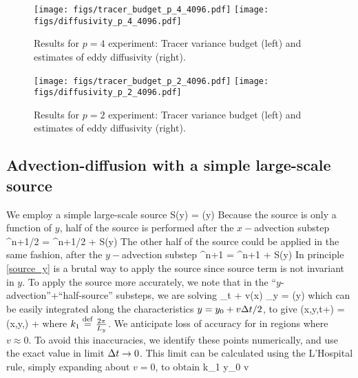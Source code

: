 \documentclass[11pt]{article}
\begin{document}
\begin{figure}[ht]
    \centering
       \texttt{[image: figs/tracer\_budget\_p\_4\_4096.pdf]}
       \texttt{[image: figs/diffusivity\_p\_4\_4096.pdf]}
       \caption{\small Results for $p=4$ experiment: Tracer variance budget (left) and estimates of eddy diffusivity (right).}
		    \label{VarianceBudgetp4}
\end{figure}

\begin{figure}[ht]
    \centering
       \texttt{[image: figs/tracer\_budget\_p\_2\_4096.pdf]}
       \texttt{[image: figs/diffusivity\_p\_2\_4096.pdf]}
       \caption{\small Results for $p=2$ experiment: Tracer variance budget (left) and estimates of eddy diffusivity (right).}
		    \label{VarianceBudgetp2}
\end{figure}




\clearpage
\subsection{Advection-diffusion with a simple large-scale source}

We employ a simple large-scale source
\beq
S(y) = \cos \left(y\right)\per
\eeq
Because the source is only a function of $y$, half of the source is performed after the $x-$advection
substep
\beq
\label{source_x}
\vth^{n+1/2} = \vth^{n+1/2} +  S(y)\per
\eeq
The other half of the source could be applied in the same fashion, after the $y-$advection
substep
\beq
\label{source_y}
\vth^{n+1} = \vth^{n+1} +  S(y)\per
\eeq
In principle \eqref{source_y} is a brutal way to apply the source since source term is not invariant in $y$.
To apply the source more accurately, we note that in the ``$y$-advection''+``half-source'' substeps, we are
solving
\beq
\vth_t + v(x) \vth_y = \cos \left(y\right)\com
\eeq
which can be easily integrated along the characteristics $y = y_0 + v \Delta t/2$, to give
\beq
\label{adv_source_y}
\vth(x,y,t+\dt) = \vth(x,y,\dt) + \per
\eeq
where $k_1 \stackrel{\mathrm{def}}{=} \frac{2\pi}{L_y}$. We anticipate loss of accuracy for in regions where $v\approx 0$. To
avoid this inaccuracies, we identify these points numerically, and use the exact value in limit $\Delta t \to 0$.
This limit can be calculated using the L'Hospital rule, simply expanding about $v=0$, to obtain
\beq
{} \to {}\cos k_1 y_0 \qquad {}
\qquad v \per
\eeq
\end{document}
